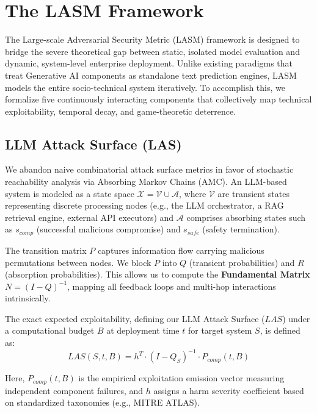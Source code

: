 \section{The LASM Framework}
\label{sec:framework}

The Large-scale Adversarial Security Metric (LASM) framework is designed to bridge the severe theoretical gap between static, isolated model evaluation and dynamic, system-level enterprise deployment. Unlike existing paradigms that treat Generative AI components as standalone text prediction engines, LASM models the entire socio-technical system iteratively. To accomplish this, we formalize five continuously interacting components that collectively map technical exploitability, temporal decay, and game-theoretic deterrence.

\subsection{LLM Attack Surface (LAS)}
\label{subsec:las}

We abandon naive combinatorial attack surface metrics in favor of stochastic reachability analysis via Absorbing Markov Chains (AMC). An LLM-based system is modeled as a state space $\mathcal{X} = \mathcal{V} \cup \mathcal{A}$, where $\mathcal{V}$ are transient states representing discrete processing nodes (e.g., the LLM orchestrator, a RAG retrieval engine, external API executors) and $\mathcal{A}$ comprises absorbing states such as $s_{comp}$ (successful malicious compromise) and $s_{safe}$ (safety termination).

The transition matrix $P$ captures information flow carrying malicious permutations between nodes. We block $P$ into $Q$ (transient probabilities) and $R$ (absorption probabilities). This allows us to compute the \textbf{Fundamental Matrix} $N = (I - Q)^{-1}$, mapping all feedback loops and multi-hop interactions intrinsically.

The exact expected exploitability, defining our LLM Attack Surface ($LAS$) under a computational budget $B$ at deployment time $t$ for target system $S$, is defined as:
\begin{equation}
    LAS(S, t, B) = h^T \cdot (I - Q_S)^{-1} \cdot P_{comp}(t, B)
\end{equation}

Here, $P_{comp}(t, B)$ is the empirical exploitation emission vector measuring independent component failures, and $h$ assigns a harm severity coefficient based on standardized taxonomies (e.g., MITRE ATLAS). 

